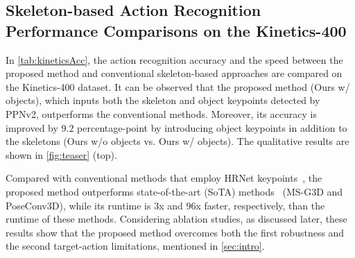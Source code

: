\documentclass[10pt,twocolumn,letterpaper]{article}
\begin{document}
\subsection{Skeleton-based Action Recognition Performance Comparisons on the Kinetics-400}
In \cref{tab:kineticsAcc}, the action recognition accuracy and the speed between the proposed method and conventional skeleton-based approaches are compared on the Kinetics-400 dataset.
It can be observed that the proposed method (Ours w/ objects), which inputs both the skeleton and object keypoints detected by PPNv2, outperforms the conventional methods.
Moreover, its accuracy is improved by $9.2$ percentage-point by introducing object keypoints in addition to the skeletons (Ours w/o objects vs. Ours w/ objects).
The qualitative results are shown in \cref{fig:teaser} (top).

Compared with conventional methods that employ HRNet keypoints~\cite{Sun2019CVPR}, the proposed method outperforms state-of-the-art (SoTA) methods~\cite{Liu2020CVPR,Duan2022CVPR} (MS-G3D and PoseConv3D), while its runtime is $3$x and $96$x faster, respectively, than the runtime of these methods.
Considering ablation studies, as discussed later, these results show that the proposed method overcomes both the first robustness and the second target-action limitations, mentioned in \cref{sec:intro}.
\end{document}
